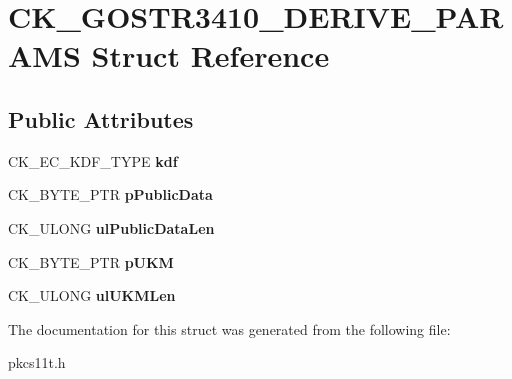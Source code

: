 \hypertarget{struct_c_k___g_o_s_t_r3410___d_e_r_i_v_e___p_a_r_a_m_s}{}\section{C\+K\+\_\+\+G\+O\+S\+T\+R3410\+\_\+\+D\+E\+R\+I\+V\+E\+\_\+\+P\+A\+R\+A\+MS Struct Reference}
\label{struct_c_k___g_o_s_t_r3410___d_e_r_i_v_e___p_a_r_a_m_s}
\subsection*{Public Attributes}
\begin{DoxyCompactItemize}
\item 
\mbox{\label{struct_c_k___g_o_s_t_r3410___d_e_r_i_v_e___p_a_r_a_m_s_abeb306578c915a5d23b3dbae721ee4dd}} 
C\+K\+\_\+\+E\+C\+\_\+\+K\+D\+F\+\_\+\+T\+Y\+PE {\bfseries kdf}
\item 
\mbox{\label{struct_c_k___g_o_s_t_r3410___d_e_r_i_v_e___p_a_r_a_m_s_adec4982ab67437e27ef867081cf086aa}} 
C\+K\+\_\+\+B\+Y\+T\+E\+\_\+\+P\+TR {\bfseries p\+Public\+Data}
\item 
\mbox{\label{struct_c_k___g_o_s_t_r3410___d_e_r_i_v_e___p_a_r_a_m_s_a3edeb032be640b4f4933bb7ff212fc5f}} 
C\+K\+\_\+\+U\+L\+O\+NG {\bfseries ul\+Public\+Data\+Len}
\item 
\mbox{\label{struct_c_k___g_o_s_t_r3410___d_e_r_i_v_e___p_a_r_a_m_s_ad9f68b0129a257cbc624bf94e4b785aa}} 
C\+K\+\_\+\+B\+Y\+T\+E\+\_\+\+P\+TR {\bfseries p\+U\+KM}
\item 
\mbox{\label{struct_c_k___g_o_s_t_r3410___d_e_r_i_v_e___p_a_r_a_m_s_a82e55db5f98418e58dd6b9909eef3849}} 
C\+K\+\_\+\+U\+L\+O\+NG {\bfseries ul\+U\+K\+M\+Len}
\end{DoxyCompactItemize}


The documentation for this struct was generated from the following file\+:\begin{DoxyCompactItemize}
\item 
pkcs11t.\+h\end{DoxyCompactItemize}
